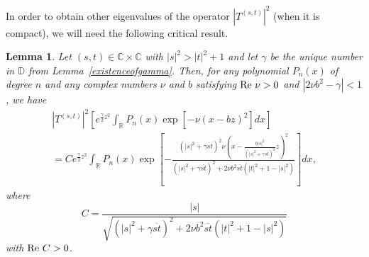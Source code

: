 \documentclass[reqno]{amsart}
\newtheorem{lemma}[theorem]{Lemma}
\newcommand{\R}{{\mathbb R}}
\newcommand{\C}{{\mathbb C}}
\newcommand{\D}{{\mathbb D}}
\newcommand{\inr}{\int_{\R}}
\DeclareMathOperator{\re}{{\rm Re}\,}
\begin{document}
In order to obtain other eigenvalues of the operator $|T^{(s,t)}|^{2}$
(when it is compact), we will need the following critical result.

\begin{lemma}\label{lempolynom}
Let $(s, t)\in\C\times\C$ with $|s|^2>|t|^2+1$ and let $\gamma$ be
the unique number in $\D$ from Lemma~\ref{existenceofgamma}.
Then, for any polynomial $P_n(x)$ of degree $n$ and any complex
numbers $\nu$ and $b$ satisfying $\re\nu>0$ and
$|2\nu b^2-\gamma|<1$, we have
\begin{multline*}
\left|T^{(s,t)}\right|^2\left[e^{\frac{\gamma}{2}z^2}
\inr  P_n(x)\exp\left[-\nu\left(x-bz\right)^2\right]dx\right]\\[8pt]
=Ce^{\frac{\gamma}{2}z^2}\inr P_n(x)
\exp\left[-\frac{(|s|^2+\gamma{\overline{st}})^{2}\nu
\left(x-\frac{b|s|^2}{(|s|^2+\gamma{\overline{st}})^2}z\right)^2}
{(|s|^2+\gamma{\overline{st}})^2+2\nu b^2{\overline{st}}
(|t|^2+1-|s|^2)}\right]dx,
\end{multline*}
where
$$C=\frac{|s|}{\sqrt{(|s|^2+\gamma
\overline{st})^2+2\nu b^2{\overline{st}}(|t|^2+1-|s|^2)}}$$
with $\re C>0$.
\end{lemma}
\end{document}
